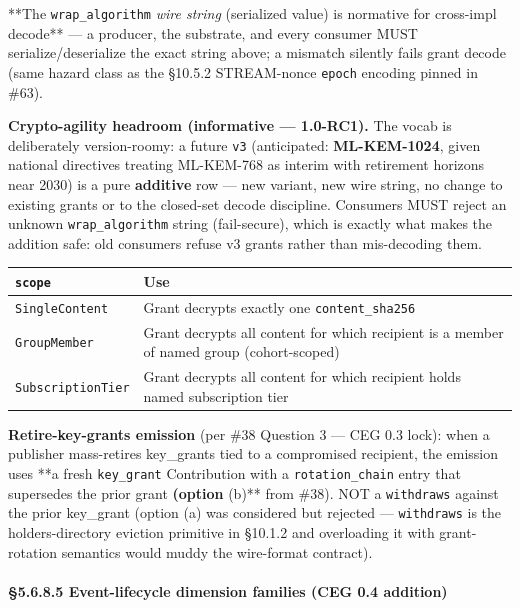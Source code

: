 \documentclass[11pt]{article}
\begin{document}
**The \texttt{wrap\_algorithm} \textit{wire string} (serialized value) is normative for cross-impl decode** — a producer, the substrate, and every consumer MUST serialize/deserialize the exact string above; a mismatch silently fails grant decode (same hazard class as the §10.5.2 STREAM-nonce \texttt{epoch} encoding pinned in \#63).


\textbf{Crypto-agility headroom (informative — 1.0-RC1).} The vocab is deliberately version-roomy: a future \texttt{v3} (anticipated: \textbf{ML-KEM-1024}, given national directives treating ML-KEM-768 as interim with retirement horizons near 2030) is a pure \textbf{additive} row — new variant, new wire string, no change to existing grants or to the closed-set decode discipline. Consumers MUST reject an unknown \texttt{wrap\_algorithm} string (fail-secure), which is exactly what makes the addition safe: old consumers refuse v3 grants rather than mis-decoding them.


{\footnotesize
\begin{longtable}{|p{8.0cm}|p{8.0cm}|}\hline
\textbf{\texttt{scope}} & \textbf{Use} \\ \hline\endhead
\texttt{SingleContent} & Grant decrypts exactly one \texttt{content\_sha256} \\ \hline
\texttt{GroupMember} & Grant decrypts all content for which recipient is a member of named group (cohort-scoped) \\ \hline
\texttt{SubscriptionTier} & Grant decrypts all content for which recipient holds named subscription tier \\ \hline
\end{longtable}}


\textbf{Retire-key-grants emission} (per \#38 Question 3 — CEG 0.3 lock): when a publisher mass-retires key\_grants tied to a compromised recipient, the emission uses **a fresh \texttt{key\_grant} Contribution with a \texttt{rotation\_chain} entry that supersedes the prior grant\textbf{ (option }(b)** from \#38). NOT a \texttt{withdraws} against the prior key\_grant (option (a) was considered but rejected — \texttt{withdraws} is the holders-directory eviction primitive in §10.1.2 and overloading it with grant-rotation semantics would muddy the wire-format contract).



\paragraph{§5.6.8.5 Event-lifecycle dimension families (CEG 0.4 addition)}\mbox{}\\
\end{document}
